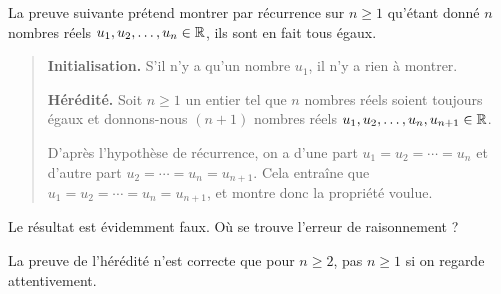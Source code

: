 







\begin{exo}
La \og preuve\fg{} suivante prétend montrer par récurrence sur $n \geq 1$ qu'étant donné $n$ nombres réels $u_1, u_2, \ldots, u_n \in \mathbb R$, ils sont en fait tous égaux.

\begin{quote}
  \textbf{Initialisation.} S'il n'y a qu'un nombre $u_1$, il n'y a rien à montrer.

  \textbf{Hérédité.} Soit $n \geq 1$ un entier tel que $n$ nombres réels soient toujours égaux et donnons-nous $(n+1)$ nombres réels $u_1, u_2, \ldots, u_n, u_{n+1} \in \mathbb R$.

  D'après l'hypothèse de récurrence, on a d'une part $u_{1} = u_{2} = \cdots = u_{n}$ et d'autre part $u_{2} = \cdots = u_{n} = u_{n+1}$. Cela entraîne que $u_{1} = u_{2} = \cdots = u_{n} = u_{n+1}$, et montre donc la propriété voulue.
\end{quote}

Le résultat est évidemment faux. Où se trouve  l'erreur de raisonnement ?
\begin{sol}
La preuve de l'hérédité n'est correcte que pour $n\geq 2$, pas $n\geq 1$ si on regarde attentivement.
\end{sol}
\end{exo}





